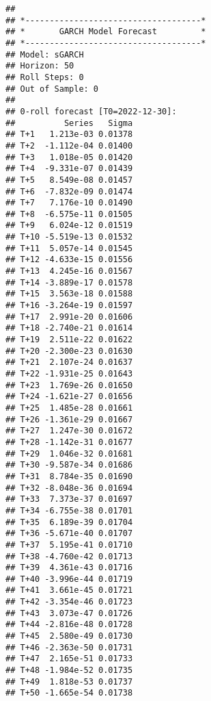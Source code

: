 \documentclass[
]{article}
\begin{document}
\begin{verbatim}
## 
## *------------------------------------*
## *       GARCH Model Forecast         *
## *------------------------------------*
## Model: sGARCH
## Horizon: 50
## Roll Steps: 0
## Out of Sample: 0
## 
## 0-roll forecast [T0=2022-12-30]:
##          Series   Sigma
## T+1   1.213e-03 0.01378
## T+2  -1.112e-04 0.01400
## T+3   1.018e-05 0.01420
## T+4  -9.331e-07 0.01439
## T+5   8.549e-08 0.01457
## T+6  -7.832e-09 0.01474
## T+7   7.176e-10 0.01490
## T+8  -6.575e-11 0.01505
## T+9   6.024e-12 0.01519
## T+10 -5.519e-13 0.01532
## T+11  5.057e-14 0.01545
## T+12 -4.633e-15 0.01556
## T+13  4.245e-16 0.01567
## T+14 -3.889e-17 0.01578
## T+15  3.563e-18 0.01588
## T+16 -3.264e-19 0.01597
## T+17  2.991e-20 0.01606
## T+18 -2.740e-21 0.01614
## T+19  2.511e-22 0.01622
## T+20 -2.300e-23 0.01630
## T+21  2.107e-24 0.01637
## T+22 -1.931e-25 0.01643
## T+23  1.769e-26 0.01650
## T+24 -1.621e-27 0.01656
## T+25  1.485e-28 0.01661
## T+26 -1.361e-29 0.01667
## T+27  1.247e-30 0.01672
## T+28 -1.142e-31 0.01677
## T+29  1.046e-32 0.01681
## T+30 -9.587e-34 0.01686
## T+31  8.784e-35 0.01690
## T+32 -8.048e-36 0.01694
## T+33  7.373e-37 0.01697
## T+34 -6.755e-38 0.01701
## T+35  6.189e-39 0.01704
## T+36 -5.671e-40 0.01707
## T+37  5.195e-41 0.01710
## T+38 -4.760e-42 0.01713
## T+39  4.361e-43 0.01716
## T+40 -3.996e-44 0.01719
## T+41  3.661e-45 0.01721
## T+42 -3.354e-46 0.01723
## T+43  3.073e-47 0.01726
## T+44 -2.816e-48 0.01728
## T+45  2.580e-49 0.01730
## T+46 -2.363e-50 0.01731
## T+47  2.165e-51 0.01733
## T+48 -1.984e-52 0.01735
## T+49  1.818e-53 0.01737
## T+50 -1.665e-54 0.01738
\end{verbatim}
\end{document}
